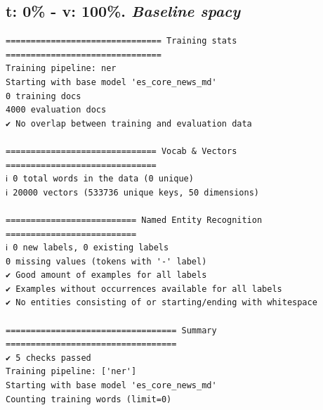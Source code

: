 \documentclass[12pt,a4paper,]{scrartcl}
\begin{document}
\hypertarget{t-0---v-100.-baseline-spacy}{%
\subsection{\texorpdfstring{t: 0\% - v: 100\%. \emph{Baseline spacy}}{t: 0\% - v: 100\%. Baseline spacy}}\label{t-0---v-100.-baseline-spacy}}

\begin{verbatim}
=============================== Training stats ===============================
Training pipeline: ner
Starting with base model 'es_core_news_md'
0 training docs
4000 evaluation docs
✔ No overlap between training and evaluation data

============================== Vocab & Vectors ==============================
ℹ 0 total words in the data (0 unique)
ℹ 20000 vectors (533736 unique keys, 50 dimensions)

========================== Named Entity Recognition ==========================
ℹ 0 new labels, 0 existing labels
0 missing values (tokens with '-' label)
✔ Good amount of examples for all labels
✔ Examples without occurrences available for all labels
✔ No entities consisting of or starting/ending with whitespace

================================== Summary ==================================
✔ 5 checks passed
Training pipeline: ['ner']
Starting with base model 'es_core_news_md'
Counting training words (limit=0)
\end{verbatim}
\end{document}

